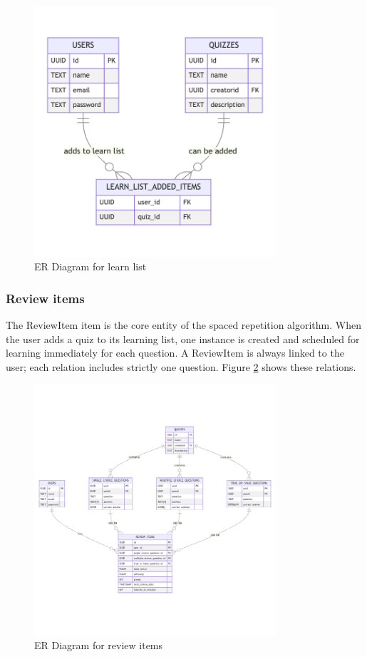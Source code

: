 \begin{figure}[H]
    \centering
    \includegraphics[width=0.8\textwidth, keepaspectratio]{figures/er-learn-list.png}
    \caption{ER Diagram for learn list}
    \label{fig:er-learn-list}
\end{figure}

\subsubsection{Review items}

The ReviewItem item is the core entity of the spaced repetition algorithm. When the user adds a quiz to its learning list, one instance is created and scheduled for learning immediately for each question. A ReviewItem is always linked to the user; each relation includes strictly one question. Figure \ref{fig:er-review-items} shows these relations.

\begin{figure}[H]
    \centering
    \includegraphics[width=0.8\textwidth, keepaspectratio]{figures/er-review-items.png}
    \caption{ER Diagram for review items}
    \label{fig:er-review-items}
\end{figure}

